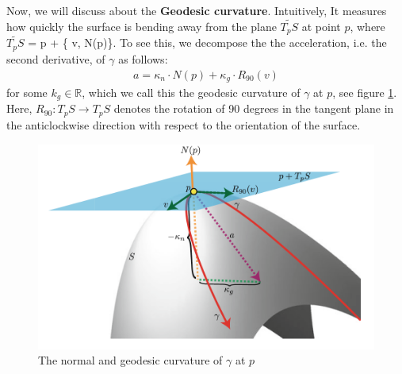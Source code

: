 \documentclass{article}
\theoremstyle{plain}
\theoremstyle{definition}
\theoremstyle{remark}
\newcommand{\R}{\mathbb{R}}
\begin{document}
Now, we will discuss about the \textbf{Geodesic curvature}. Intuitively, It measures how quickly the surface is bending away from the plane \( \widetilde{T_pS}\) at point \(p\), where \( \widetilde{T_pS}\) = p + \{ v, N(p)\}. To see this, we decompose the the acceleration, i.e. the second derivative, of \( \gamma\) as follows: 
\begin{align*}
    a = \kappa_n \cdot N(p) + \kappa_g \cdot R_{90}(v)
\end{align*}
for some \(k_g \in \R\), which we call this the geodesic curvature of \( \gamma\) at \(p\), see figure \ref{fig:normal_and_geodesic_curvature}. Here, \( R_{90}: T_pS \rightarrow T_pS \) denotes the rotation of 90 degrees in the tangent plane in the anticlockwise direction with respect to the orientation of the surface. \\
\begin{figure}[h]
    \centering
    \includegraphics[width=12cm]{./images/normal_and_geodesic_curvature}
    \caption{The normal and geodesic curvature of \(\gamma\) at \(p\)}
    \label{fig:normal_and_geodesic_curvature}
\end{figure}
\end{document}
